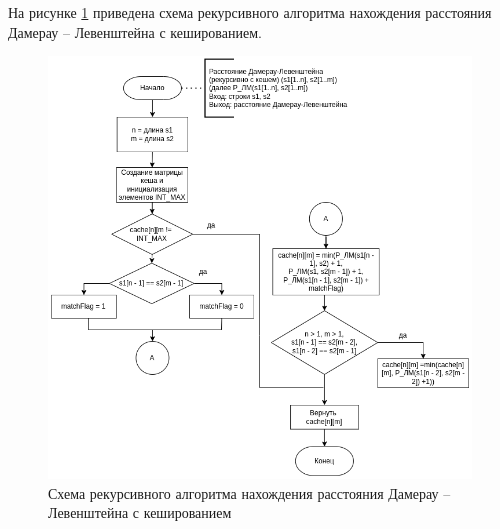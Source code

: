 \newpage
На рисунке \ref{img:recursive_with_mem} приведена схема рекурсивного алгоритма нахождения расстояния Дамерау -- Левенштейна с кешированием.
\begin{figure}[h]
	\centering
	\includegraphics[width=160mm]{damerauCache}
	\caption{Схема рекурсивного алгоритма нахождения расстояния Дамерау -- Левенштейна с кешированием}
	\label{img:recursive_with_mem}
\end{figure}

